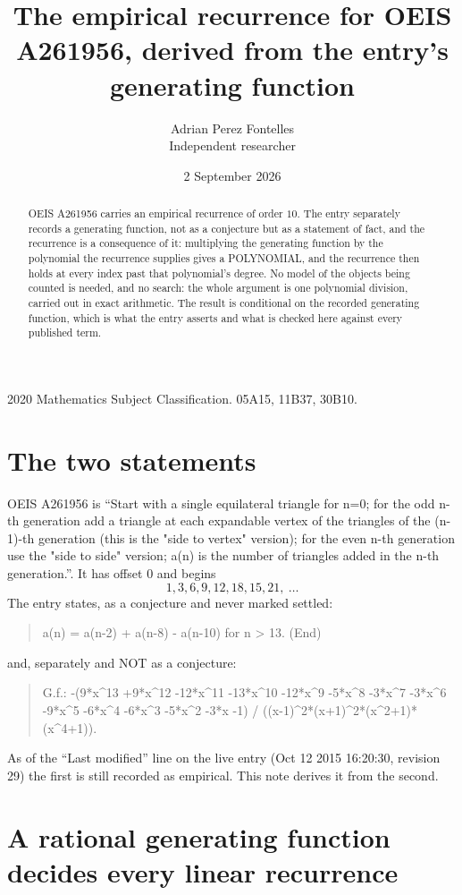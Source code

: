 \documentclass[11pt,a4paper]{article}
\title{The empirical recurrence for OEIS A261956, derived from the entry's generating function}
\author{Adrian Perez Fontelles\\ \small Independent researcher}
\date{2 September 2026}
\theoremstyle{plain}
\theoremstyle{definition}
\begin{document}
\maketitle

\begin{abstract}
OEIS A261956 carries an empirical recurrence of order $10$. The entry separately records a
generating function, not as a conjecture but as a statement of fact, and the recurrence is a
consequence of it: multiplying the generating function by the polynomial the recurrence
supplies gives a POLYNOMIAL, and the recurrence then holds at every index past that
polynomial's degree. No model of the objects being counted is needed, and no search: the
whole argument is one polynomial division, carried out in exact arithmetic. The result is
conditional on the recorded generating function, which is what the entry asserts and what is
checked here against every published term.
\end{abstract}

\noindent\small 2020 Mathematics Subject Classification. 05A15, 11B37, 30B10.\normalsize

\section{The two statements}

OEIS A261956 is ``Start with a single equilateral triangle for n=0; for the odd n-th generation add a triangle at each expandable vertex of the triangles of the (n-1)-th generation (this is the "side to vertex" version); for the even n-th generation use the "side to side" version; a(n) is the number of triangles added in the n-th generation.''. It has offset $0$ and begins
\[
1, 3, 6, 9, 12, 18, 15, 21,\ \dots
\]
The entry states, as a conjecture and never marked settled:
\begin{quote}
a(n) = a(n-2) + a(n-8) - a(n-10) for n > 13. (End)
\end{quote}
and, separately and NOT as a conjecture:
\begin{quote}
G.f.: -(9*x\^{}13 +9*x\^{}12 -12*x\^{}11 -13*x\^{}10 -12*x\^{}9 -5*x\^{}8 -3*x\^{}7 -3*x\^{}6 -9*x\^{}5 -6*x\^{}4 -6*x\^{}3 -5*x\^{}2 -3*x -1) / ((x-1)\^{}2*(x+1)\^{}2*(x\^{}2+1)*(x\^{}4+1)).
\end{quote}
As of the ``Last modified'' line on the live entry (Oct 12 2015 16:20:30, revision 29) the first is still
recorded as empirical. This note derives it from the second.

\section{A rational generating function decides every linear recurrence}
\end{document}
